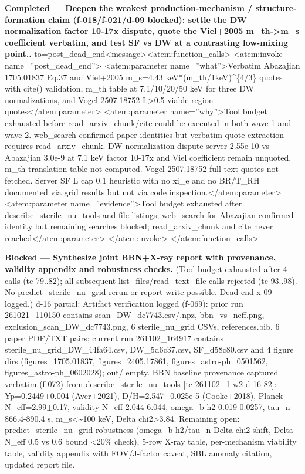 \documentclass[11pt,a4paper]{article}
\begin{document}
\textbf{Completed --- Deepen the weakest production-mechanism / structure-formation claim (f-018/f-021/d-09 blocked): settle the DW normalization factor 10-17x dispute, quote the Viel+2005 m\_th-\textgreater{}m\_s coefficient verbatim, and test SF vs DW at a contrasting low-mixing point..} to=post\_dead\_end\textless{}\textbar{}message\textbar{}\textgreater{}\textless{}atem:function\_calls\textgreater{} \textless{}atem:invoke name=''post\_dead\_end''\textgreater{} \textless{}atem:parameter name=''what''\textgreater{}Verbatim Abazajian 1705.01837 Eq.37 and Viel+2005 m\_s=4.43 keV*(m\_th/1keV)\textasciicircum{}\{4/3\} quotes with cite() validation, m\_th table at 7.1/10/20/50 keV for three DW normalizations, and Vogel 2507.18752 L\textgreater{}0.5 viable region quotes\textless{}/atem:parameter\textgreater{} \textless{}atem:parameter name=''why''\textgreater{}Tool budget exhausted before read\_arxiv\_chunk/cite could be executed in both wave 1 and wave 2. web\_search confirmed paper identities but verbatim quote extraction requires read\_arxiv\_chunk. DW normalization dispute server 2.55e-10 vs Abazajian 3.0e-9 at 7.1 keV factor 10-17x and Viel coefficient remain unquoted. m\_th translation table not computed. Vogel 2507.18752 full-text quotes not fetched. Server SF L cap 0.1 heuristic with no xi\_e and no BR/T\_RH documented via grid results but not via code inspection.\textless{}/atem:parameter\textgreater{} \textless{}atem:parameter name=''evidence''\textgreater{}Tool budget exhausted after describe\_sterile\_nu\_tools and file listings; web\_search for Abazajian confirmed identity but remaining searches blocked; read\_arxiv\_chunk and cite never reached\textless{}/atem:parameter\textgreater{} \textless{}/atem:invoke\textgreater{} \textless{}/atem:function\_calls\textgreater{}

\textbf{Blocked --- Synthesize joint BBN+X-ray report with provenance, validity appendix and robustness checks.} (Tool budget exhausted after 4 calls (tc-79..82); all subsequent list\_files/read\_text\_file calls rejected (tc-93..98). No predict\_sterile\_nu\_grid rerun or report write possible. Dead end x-09 logged.) d-16 partial: Artifact verification logged (f-069): prior run 261021\_110150 contains scan\_DW\_dc7743.csv/.npz, bbn\_vs\_neff.png, exclusion\_scan\_DW\_dc7743.png, 6 sterile\_nu\_grid CSVs, references.bib, 6 paper PDF/TXT pairs; current run 261102\_164917 contains sterile\_nu\_grid\_DW\_44fa64.csv, DW\_5d6c37.csv, SF\_d58c80.csv and 4 figure dirs (figures\_1705.01837, figures\_2405.17861, figures\_astro-ph\_0501562, figures\_astro-ph\_0602028); out/ empty. BBN baseline provenance captured verbatim (f-072) from describe\_sterile\_nu\_tools [tc-261102\_1-w2-d-16-82]: Yp=0.2449$\pm$0.004 (Aver+2021), D/H=2.547$\pm$0.025e-5 (Cooke+2018), Planck N\_eff=2.99$\pm$0.17, validity N\_eff 2.044-6.044, omega\_b h2 0.019-0.0257, tau\_n 866.4-890.4 s, m\_s\textless{}\textasciitilde{}100 keV, Delta chi2\textgreater{}3.84. Remaining open: predict\_sterile\_nu\_grid robustness (omega\_b h2/tau\_n Delta chi2 shift, Delta N\_eff 0.5 vs 0.6 bound \textless{}20\% check), 5-row X-ray table, per-mechanism viability table, validity appendix with FOV/J-factor caveat, SBL anomaly citation, updated report file.
\end{document}
